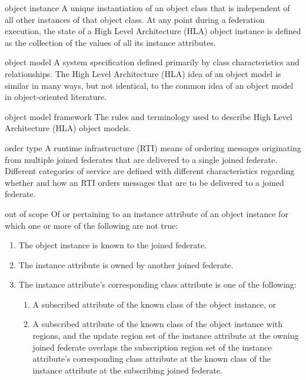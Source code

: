 \begin{definition}{object instance}
    A unique instantiation of an object class that is independent of all other instances of that object class. At any point during a federation execution, the state of a High Level Architecture (HLA) object instance is defined as the collection of the values of all its instance attributes.
\end{definition}

\begin{definition}{object model}
    A system specification defined primarily by class characteristics and relationships. The High Level Architecture (HLA) idea of an object model is similar in many ways, but not identical, to the common idea of an object model in object-oriented literature.
\end{definition}

\begin{definition}{object model framework}
    The rules and terminology used to describe High Level Architecture (HLA) object models.
\end{definition}

\begin{definition}{order type}
    A runtime infrastructure (RTI) means of ordering messages originating from multiple joined federates that are delivered to a single joined federate. Different categories of service are defined with different characteristics regarding whether and how an RTI orders messages that are to be delivered to a joined federate.
\end{definition}

\begin{definition}{out of scope}
    Of or pertaining to an instance attribute of an object instance for which one or more of the following are not true:
\end{definition}

\begin{enumerate}[label=\alph*)]
\item The object instance is known to the joined federate.
\item The instance attribute is owned by another joined federate.
\item The instance attribute's corresponding class attribute is one of the following:
\begin{enumerate}[label=\arabic*)]
\item A subscribed attribute of the known class of the object instance, or
\item A subscribed attribute of the known class of the object instance with regions, and the update region set of the instance attribute at the owning joined federate overlaps the subscription region set of the instance attribute's corresponding class attribute at the known class of the instance attribute at the subscribing joined federate.
\par{}
\end{enumerate}
\end{enumerate}

